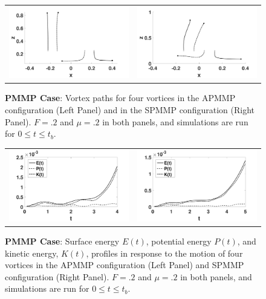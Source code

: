 \documentclass[a4paper,11pt]{article}
\begin{document}
%
\begin{figure}[!h]
\centering
\begin{tabular}{cc}
\includegraphics[width=.5\textwidth]{tracks_F_pt2_tf_4_pmmp} & 
\includegraphics[width=.5\textwidth]{tracks_F_pt2_tf_5_pmmp_sym}
\end{tabular}
\caption{\small {\bf PMMP Case}: Vortex paths for four vortices in the APMMP configuration  (Left Panel) and in the SPMMP configuration (Right Panel). $F=.2$ and $\mu=.2$ in both panels, and simulations are run for $0\leq t \leq t_{b}$.}
\label{fig:trackpmmp}
\end{figure}

\begin{figure}[!h]
\centering
\begin{tabular}{cc}
\includegraphics[width=.5\textwidth]{energy_profile_mu_pt2_F_pt2_pmmp} &
\includegraphics[width=.5\textwidth]{energy_profile_mu_pt2_F_pt2_pmmp_sym}
\end{tabular}
\caption{\small {\bf PMMP Case}:  Surface energy $E(t)$, potential energy $P(t)$, and kinetic energy, $K(t)$, profiles in response to the motion of four vortices in the APMMP configuration (Left Panel) and SPMMP configuration (Right Panel).  $F=.2$ and $\mu=.2$ in both panels, and simulations are run for $0\leq t \leq t_{b}$.}
\label{fig:eprof_pmmp}
\end{figure}
\end{document}
